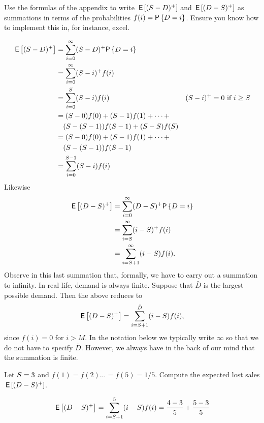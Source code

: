 \begin{exercise}
  Use the formulas of the appendix to write $\,\mathsf{E}\left[(S-D)^+\right]$ and $\,\mathsf{E}\left[(D-S)^+\right]$ as summations in terms of the probabilities $f(i) = \P{D=i}$. Ensure you know how to implement this in, for instance, excel.
  \begin{solution}
\begin{align*}
  \E{ (\Q-D)^+}
  &= \sum_{i=0}^\infty (\Q-D)^+\P{D=i}\\
  &= \sum_{i=0}^\infty (\Q-i)^+ f(i)\\
  &= \sum_{i=0}^\Q (\Q-i) f(i) & (\Q-i)^+=0\text{ if } i \geq \Q\\
  &= (\Q-0) f(0) + (\Q-1)f(1)+ \cdots + \\
&\quad (\Q-(\Q-1))f(\Q-1) + (\Q-\Q)f(\Q) \\
  &= (\Q-0) f(0)+ (\Q-1)f(1)+ \cdots + \\
&\quad(\Q-(\Q-1))f(\Q-1)\\
  &= \sum_{i=0}^{\Q-1} (\Q-i) f(i) \\
\end{align*}
Likewise
\begin{align*}
  \E{ (D-\Q)^+}
  &= \sum_{i=0}^\infty (D-\Q)^+\P{D=i}\\
  &= \sum_{i=\Q}^\infty (i-\Q)^+ f(i)\\
  &= \sum_{i=\Q+1}^{\infty} (i-\Q) f(i).
\end{align*}
Observe in this last summation that, formally, we have to carry out a summation to infinity. In real life, demand is always finite. Suppose that $\bar D$ is the largest possible demand. Then the above reduces to
\begin{align*}
  \,\mathsf{E}\left[ (D-S)^+\right]= \sum_{i=S+1}^{\bar D} (i-S) f(i),
\end{align*}
since $f(i)=0$ for $i>M$.   In the notation below we typically write $\infty$ so that we do not have to specify $\bar D$. However, we always have in the back of our mind that the summation is finite.
  \end{solution}
\end{exercise}


\begin{exercise}
  Let $S=3$ and  $f(1)=f(2)\ldots=f(5) = 1/5$. Compute the expected lost sales $\,\mathsf{E}\left[(D-S)^+\right]$.
  \begin{solution}
    \begin{align*}
      \,\mathsf{E}\left[(D-S)^+\right] &= \sum_{i=S+1}^5 (i-S) f(i) = \frac{4-3}5 + \frac{5-3}5\\
    \end{align*}
  \end{solution}
\end{exercise}

